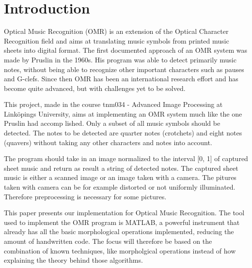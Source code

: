 \section{Introduction}




Optical Music Recognition (OMR) is an extension of the Optical Character Recognition field and aims at translating music symbols from printed music sheets into digital format. The first documented approach of an OMR system was made by Pruslin in the 1960s. His program was able to detect primarily music notes, without being able to recognize other important characters such as pauses and G-clefs. Since then OMR has been an international research effort and has become quite advanced, but with challenges yet to be solved. \cite{bainb2001}  %

This project, made in the course tnm034 - Advanced Image Processing at Link\"{o}pings University, aims at implementing an OMR system much like the one Pruslin had accomp
lished. Only a subset of all music symbols should be detected. The notes to be detected are quarter notes (crotchets) and eight notes (quavers) without taking any other characters and notes into account.

The program should take in an image normalized to the interval [0, 1] of captured sheet music and return as result a string of detected notes. The captured sheet music is either a scanned image or an image taken with a camera.  The pitures taken with camera can be for example distorted or not uniformly illuminated. Therefore preprocessing is necessary for some pictures.  



This paper presents our implementation for Optical Music Recognition. The tool used to implement the OMR program is MATLAB, a powerful instrument that already has all the basic morphological operations implemented, reducing the amount of handwritten code. The focus will therefore be based on the combination of known techniques, like morpholgical operations instead of how explaining the theory behind those algorithms.

